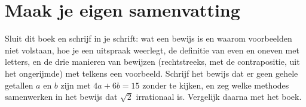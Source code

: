 
\begin{oefeningen}





\end{oefeningen}


\ifzelfstudie
\section*{Maak je eigen samenvatting}
Sluit dit boek en schrijf in je schrift: wat een bewijs is en waarom voorbeelden niet volstaan, hoe je een uitspraak weerlegt, de definitie van even en oneven met letters, en de drie manieren van bewijzen (rechtstreeks, met de contrapositie, uit het ongerijmde) met telkens een voorbeeld. Schrijf het bewijs dat er geen gehele getallen $a$ en $b$ zijn met $4a + 6b = 15$ zonder te kijken, en zeg welke methodes samenwerken in het bewijs dat $\sqrt2$ irrationaal is. Vergelijk daarna met het boek.
\fi
